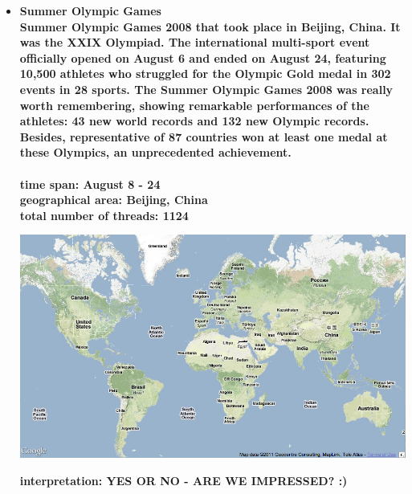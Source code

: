 \documentclass[11pt,a4paper,english]{article}
\begin{document}
\begin{itemize}
					\item \bf Summer Olympic Games \rm
						\\ Summer Olympic Games 2008 that took place in Beijing, China. It was the XXIX Olympiad. The international multi-sport event officially opened on August 6 and ended on August 24, featuring 10,500 athletes who struggled for the Olympic Gold medal in 302 events in 28 sports. The Summer Olympic Games 2008 was really worth remembering, showing remarkable performances of the athletes: 43 new world records and 132 new Olympic records. Besides, representative of 87 countries won at least one medal at these Olympics, an unprecedented achievement.
						\\\\ \bf time span: \rm August 8 - 24
						\\ \bf geographical area: \rm Beijing, China
						\\ \bf total number of threads: \rm 1124
					
						\includegraphics[width=130mm]{img/2005-1}
						
						\bf interpretation: \rm YES OR NO - ARE WE IMPRESSED? :)
						
						
						
				\end{itemize}
			
\end{document}
